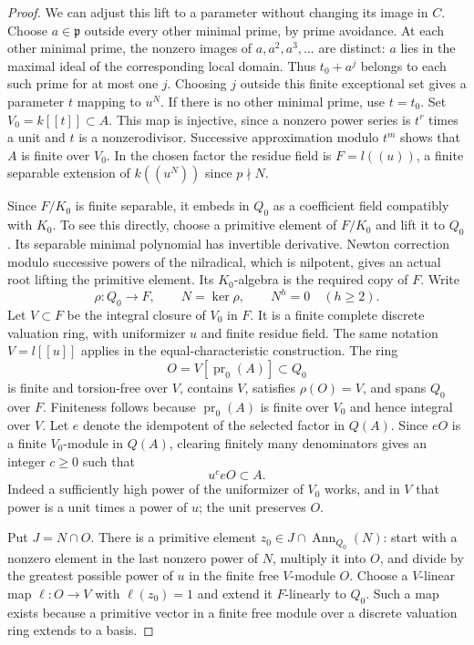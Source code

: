 \begin{proof}
We can adjust this lift to a parameter without changing its
image in $C$. Choose
$a\in\mathfrak p$ outside every other minimal prime, by
prime avoidance. At each other minimal prime, the nonzero
images of $a,a^2,a^3,\ldots$ are distinct: $a$ lies in
the maximal ideal of the corresponding local domain.
Thus $t_0+a^j$ belongs to each such prime for at most one
$j$. Choosing $j$ outside this finite exceptional set gives
a parameter $t$ mapping to $u^N$. If there is no other
minimal prime, use $t=t_0$.
Set $V_0=k[[t]]\subset A$. This map is injective, since
a nonzero power series is $t^r$ times a unit and $t$ is a
nonzerodivisor. Successive approximation modulo $t^m$ shows
that $A$ is finite over $V_0$. In the chosen factor the
residue field is $F=l((u))$, a finite separable extension
of $k((u^N))$ since $p\nmid N$.

Since $F/K_0$ is finite separable, it embeds in $Q_0$ as
a coefficient field compatibly with $K_0$. To see this
directly, choose a primitive element of $F/K_0$ and lift
it to $Q_0$. Its separable minimal polynomial has invertible
derivative. Newton correction modulo successive powers of
the nilradical, which is nilpotent, gives an actual root
lifting the primitive element. Its $K_0$-algebra is the
required copy of $F$. Write
\[
 \rho:Q_0\longrightarrow F,\qquad N=\ker\rho,
 \qquad N^h=0\quad(h\ge2).
\]
Let $V\subset F$ be the integral closure of $V_0$ in $F$.
It is a finite complete discrete valuation ring, with
uniformizer $u$ and finite residue field. The same notation
$V=l[[u]]$ applies in the equal-characteristic construction.
The ring
\[
 O=V[\operatorname{pr}_0(A)]\subset Q_0
\]
is finite and torsion-free over $V$, contains $V$, satisfies
$\rho(O)=V$, and spans $Q_0$ over $F$.
Finiteness follows because $\operatorname{pr}_0(A)$ is
finite over $V_0$ and hence integral over $V$.
Let $e$ denote the idempotent of the selected factor in
$Q(A)$. Since $eO$ is a finite $V_0$-module in $Q(A)$,
clearing finitely many denominators gives an integer $c\ge0$
such that
\[
                         u^c eO\subset A.                 \tag{B45.1}
\]
Indeed a sufficiently high power of the uniformizer of
$V_0$ works, and in $V$ that power is a unit times a
power of $u$; the unit preserves $O$.

Put $J=N\cap O$. There is a primitive element
$z_0\in J\cap\operatorname{Ann}_{Q_0}(N)$: start with a
nonzero element in the last nonzero power of $N$, multiply
it into $O$, and divide by the greatest possible power of
$u$ in the finite free $V$-module $O$. Choose a
$V$-linear map $\ell:O\to V$ with $\ell(z_0)=1$ and
extend it $F$-linearly to $Q_0$. Such a map exists because
a primitive vector in a finite free module over a discrete
valuation ring extends to a basis.


\end{proof}
